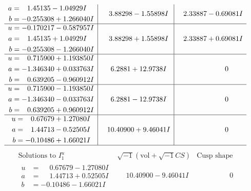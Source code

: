 \documentclass[1p]{elsarticle_modified}
\theoremstyle{definition}
\newcommand{\I}{\sqrt{-1}}
\begin{document}
$$\begin{array}{c|c|c}
\begin{aligned}
a &= \phantom{-}1.45135 - 1.04929 I \\
b &= -0.255308 + 1.266040 I\end{aligned}
 & \phantom{-}3.88298 - 1.55898 I & \phantom{-}2.33887 - 0.69081 I \\ \hline\begin{aligned}
u &= -0.170217 - 0.587957 I \\
a &= \phantom{-}1.45135 + 1.04929 I \\
b &= -0.255308 - 1.266040 I\end{aligned}
 & \phantom{-}3.88298 + 1.55898 I & \phantom{-}2.33887 + 0.69081 I \\ \hline\begin{aligned}
u &= \phantom{-}0.715900 + 1.193850 I \\
a &= -1.346340 + 0.033763 I \\
b &= \phantom{-}0.639205 - 0.960912 I\end{aligned}
 & \phantom{-}6.2881 + 12.9738 I & \phantom{-0.000000 } 0 \\ \hline\begin{aligned}
u &= \phantom{-}0.715900 - 1.193850 I \\
a &= -1.346340 - 0.033763 I \\
b &= \phantom{-}0.639205 + 0.960912 I\end{aligned}
 & \phantom{-}6.2881 - 12.9738 I & \phantom{-0.000000 } 0 \\ \hline\begin{aligned}
u &= \phantom{-}0.67679 + 1.27080 I \\
a &= \phantom{-}1.44713 - 0.52505 I \\
b &= -0.10486 + 1.66021 I\end{aligned}
 & \phantom{-}10.40900 + 9.46041 I & \phantom{-0.000000 } 0\\
 \hline 
 \end{array}$$\newpage$$\begin{array}{c|c|c}  
\text{Solutions to }I^u_{1}& \I (\text{vol} + \sqrt{-1}CS) & \text{Cusp shape}\\
 \hline 
\begin{aligned}
u &= \phantom{-}0.67679 - 1.27080 I \\
a &= \phantom{-}1.44713 + 0.52505 I \\
b &= -0.10486 - 1.66021 I\end{aligned}
 & \phantom{-}10.40900 - 9.46041 I & \phantom{-0.000000 } 0 \\ \hline\begin{aligned}

\end{aligned}
\end{array}$$
\end{document}

